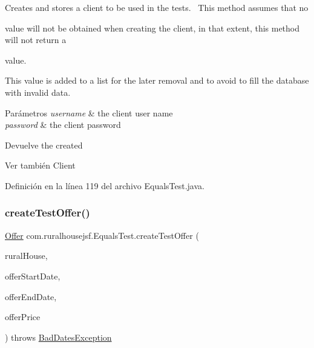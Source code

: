 Creates and stores a client to be used in the tests.~\newline
 This method assumes that no
\begin{DoxyCode}{0}
\DoxyCodeLine{\textcolor{keyword}{null} }
\end{DoxyCode}
 value will not be obtained when creating the client, in that extent, this method will not return a 
\begin{DoxyCode}{0}
\DoxyCodeLine{\textcolor{keyword}{null} }
\end{DoxyCode}
 value. 

This value is added to a list for the later removal and to avoid to fill the database with invalid data.


\begin{DoxyParams}{Parámetros}
{\em username} & the client user name \\
\hline
{\em password} & the client password\\
\hline
\end{DoxyParams}
\begin{DoxyReturn}{Devuelve}
the created
\begin{DoxyCode}{0}
\end{DoxyCode}

\end{DoxyReturn}
\begin{DoxySeeAlso}{Ver también}
Client 
\end{DoxySeeAlso}


Definición en la línea 119 del archivo Equals\+Test.\+java.

\mbox{\label{classcom_1_1ruralhousejsf_1_1_equals_test_a322f0b87565b40ecb1d9d0e6246ebaa0}} 
\subsubsection{\texorpdfstring{createTestOffer()}{createTestOffer()}}
{\footnotesize\ttfamily \mbox{\hyperlink{classcom_1_1ruralhousejsf_1_1domain_1_1_offer}{Offer}} com.\+ruralhousejsf.\+Equals\+Test.\+create\+Test\+Offer (\begin{DoxyParamCaption}\item[{\mbox{\hyperlink{classcom_1_1ruralhousejsf_1_1domain_1_1_rural_house}{Rural\+House}}}]{rural\+House,  }\item[{Local\+Date}]{offer\+Start\+Date,  }\item[{Local\+Date}]{offer\+End\+Date,  }\item[{double}]{offer\+Price }\end{DoxyParamCaption}) throws \mbox{\hyperlink{classcom_1_1ruralhousejsf_1_1exceptions_1_1_bad_dates_exception}{Bad\+Dates\+Exception}}\hspace{0.3cm}{\ttfamily [private]}}

